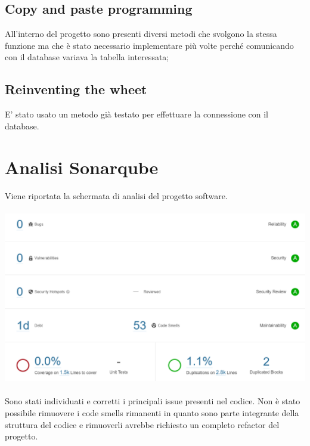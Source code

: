 \documentclass[a4paper, titlepage]{article}
\begin{document}
\subsection{Copy and paste programming}
All'interno del progetto sono presenti diversi metodi che svolgono la stessa funzione ma che è stato necessario implementare più volte perché comunicando con il database variava la tabella interessata;
\subsection{Reinventing the wheet}
E' stato usato un metodo già testato per effettuare la connessione con il database.

\section{Analisi Sonarqube}
Viene riportata la schermata di analisi del progetto software.\\\\
\includegraphics[scale=0.60]{Immagini/form/Sonarqube.png}
\\\\
Sono stati individuati e corretti i principali issue presenti nel codice.
Non è stato possibile rimuovere i code smells rimanenti in quanto sono parte integrante della struttura del codice e rimuoverli avrebbe richiesto un completo refactor del progetto.
\end{document}
